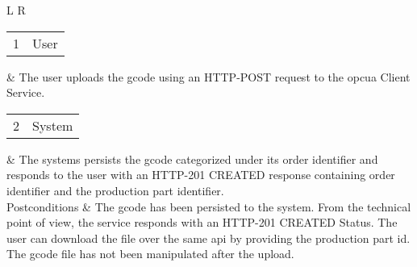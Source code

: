 \documentclass[
a4paper,
twoside,
headsepline,
cleardoublepage=empty,
parskip=half,
draft=false
]{scrbook}
\begin{document}
\begin{table}[htbp]
\begin{tabular}{L R}
						\begin{tabular}{c c} 1 & User \end{tabular} & The user uploads the \gls{gcode} using an HTTP-POST request to the \gls{opcua} Client Service.
						\\ \midrule
						\begin{tabular}{c c} 2 & System \end{tabular} & The systems persists the \gls{gcode} categorized under its order identifier and responds to the user with an HTTP-201 CREATED response containing order identifier and the production part identifier.
						\\ \midrule
						Postconditions & The \gls{gcode} has been persisted to the system. From the technical point of view, the service responds with an HTTP-201 CREATED Status. The user can download the file over the same \gls{api} by providing the production part id. The \gls{gcode} file has not been manipulated after the upload.
						\\ \bottomrule
					\end{tabular}
				\end{table}
			
\end{document}
